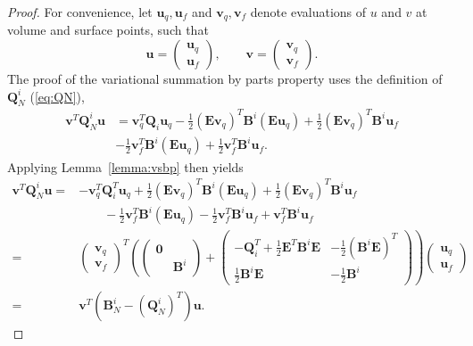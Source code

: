 \documentclass{svjour3}                     %
\newcommand{\LRp}[1]{\left( #1 \right)}
\begin{document}
\begin{proof}
For convenience, let $\bm{u}_q, \bm{u}_f$ and $\bm{v}_q, \bm{v}_f$ denote evaluations of $u$ and $v$ at volume and surface points, such that 
\[
\bm{u} = \begin{pmatrix} \bm{u}_q\\ \bm{u}_f\end{pmatrix}, \qquad \bm{v} = \begin{pmatrix} \bm{v}_q\\ \bm{v}_f\end{pmatrix}.  
\]
The proof of the variational summation by parts property uses the definition of $\bm{Q}^i_N$ (\ref{eq:QN}), 
\begin{align*}
\bm{v}^T\bm{Q}^i_N\bm{u} &= \bm{v}_q^T\bm{Q}_i \bm{u}_q - \frac{1}{2}\LRp{\bm{E}\bm{v}_q}^T\bm{B}^i \LRp{\bm{E}\bm{u}_q} + \frac{1}{2}\LRp{\bm{E}\bm{v}_q}^T\bm{B}^i \bm{u}_f\\
& - \frac{1}{2}\bm{v}_f^T\bm{B}^i \LRp{\bm{E}\bm{u}_q} + \frac{1}{2}\bm{v}_f^T\bm{B}^i \bm{u}_f.
\end{align*}
Applying Lemma~\ref{lemma:vsbp} then yields
\begin{align*}
\bm{v}^T\bm{Q}^i_N\bm{u} =& -\bm{v}_q^T\bm{Q}^T_i \bm{u}_q + \frac{1}{2}\LRp{\bm{E}\bm{v}_q}^T\bm{B}^i \LRp{\bm{E}\bm{u}_q} + \frac{1}{2}\LRp{\bm{E}\bm{v}_q}^T\bm{B}^i \bm{u}_f\\
&\qquad - \frac{1}{2}\bm{v}_f^T\bm{B}^i \LRp{\bm{E}\bm{u}_q} - \frac{1}{2}\bm{v}_f^T\bm{B}^i \bm{u}_f + \bm{v}_f^T\bm{B}^i \bm{u}_f\\
=& \begin{pmatrix} \bm{v}_q\\ \bm{v}_f\end{pmatrix}^T 
\left(\begin{pmatrix}
\bm{0}& \\
& \bm{B}^i
\end{pmatrix}\right.+
\left.\begin{pmatrix}
-\bm{Q}_i^T + \frac{1}{2}{\bm{E}}^T\bm{B}^i \bm{E} & -\frac{1}{2} \LRp{\bm{B}^i \bm{E}}^T\\
\frac{1}{2}\bm{B}^i \bm{E} & -\frac{1}{2}\bm{B}^i
\end{pmatrix}  \right)
\begin{pmatrix} \bm{u}_q\\ \bm{u}_f\end{pmatrix}\\
=& \bm{v}^T\LRp{\bm{B}^i_N - \LRp{\bm{Q}^i_N}^T}\bm{u}.
\end{align*}
\end{proof}
\end{document}
